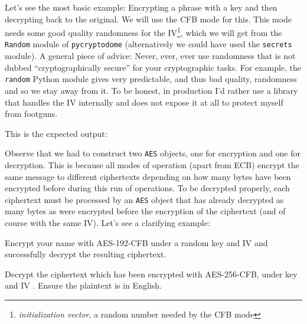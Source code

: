 \documentclass[a4paper,11pt]{article}
\begin{document}
    Let's see the most basic example: Encrypting a phrase with a key and then
    decrypting back to the original. We will use the CFB mode for this. This
    mode needs some good quality randomness for the
    IV\footnote{\emph{initialization vector}, a random number needed by the CFB
    mode}, which we will get from the \texttt{Random} module of
    \texttt{pycryptodome} (alternatively we could have used the \texttt{secrets}
    module). A general piece of advice: Never, ever, ever use randomness that is
    not dubbed ``cryptographically secure'' for your cryptographic tasks. For
    example, the \texttt{random} Python module gives very predictable, and thus
    bad quality, randomness and so we stay away from it. To be honest, in
    production I'd rather use a library that handles the IV internally and does
    not expose it at all to protect myself from footguns.

    \codelisting{\aesbasic}
    This is the expected output:
    \outputlisting{\aesbasic}

    Observe that we had to construct two \texttt{AES} objects, one for
    encryption and one for decryption. This is because all modes of operation
    (apart from ECB) encrypt the same message to different ciphertexts depending
    on how many bytes have been encrypted before during this run of operations.
    To be decrypted properly, each ciphertext must be processed by an
    \texttt{AES} object that has already decrypted as many bytes as were
    encrypted before the encryption of the ciphertext (and of course with the
    same IV). Let's see a clarifying example:

    \codelisting{\aesmode}

    \begin{exercise}
      \label{ex:aes:name}
      Encrypt your name with AES-192-CFB under a random key and IV and
      successfully decrypt the resulting ciphertext.
    \end{exercise}


    \begin{exercise}
      \label{ex:aes:classified}
      Decrypt the ciphertext \topythonbytes{\classifiedciphertext} which has
      been encrypted with AES-256-CFB, under key \topythonbytes{\classifiedkey}
      and IV \topythonbytes{\classifiediv}. Ensure the plaintext is in English.
    \end{exercise}
\end{document}
